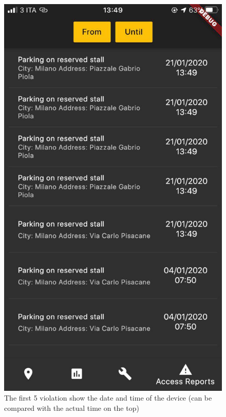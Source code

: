 \documentclass[../ATD.tex]{subfiles}
\begin{document}
    \begin{figure}[H]
        \centering
        \includegraphics{../assets/access_report_municipality.png}
        \caption{The first 5 violation show the date and time of the device (can be compared with the actual time on the top)}
    \end{figure}
\end{document}
